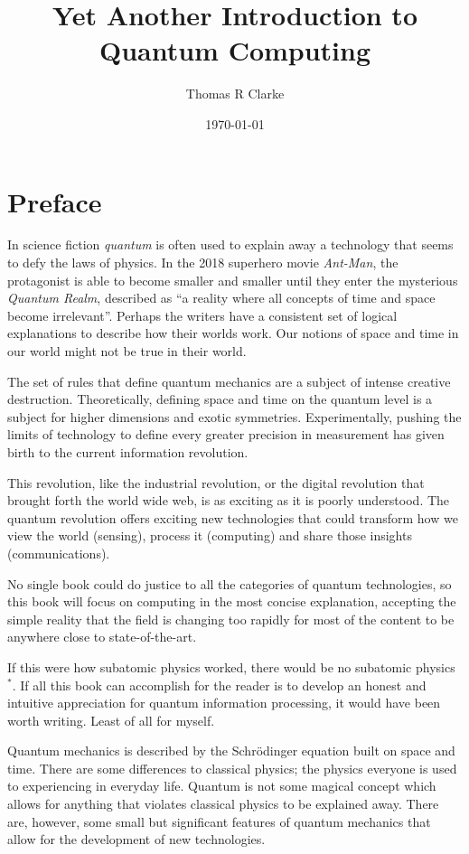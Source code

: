 \documentclass{book}
\title{Yet Another Introduction to Quantum Computing}
\author{Thomas R Clarke}
\date{\today}
\begin{document}
\maketitle

\chapter*{Preface}

In science fiction \textit{quantum} is often used to explain away a technology that seems to defy the laws of physics. In the 2018 superhero movie \textit{Ant-Man}, the protagonist is able to become smaller and smaller until they enter the mysterious \textit{Quantum Realm}, described as “a reality where all concepts of time and space become irrelevant”. Perhaps the writers have a consistent set of logical explanations to describe how their worlds work. Our notions of space and time in our world might not be true in their world. 

The set of rules that define quantum mechanics are a subject of intense creative destruction. Theoretically, defining space and time on the quantum level is a subject for higher dimensions and exotic symmetries. Experimentally, pushing the limits of technology to define every greater precision in measurement has given birth to the current information revolution. 

This revolution, like the industrial revolution, or the digital revolution that brought forth the world wide web, is as exciting as it is poorly understood. The quantum revolution offers exciting new technologies that could transform how we view the world (sensing), process it (computing) and share those insights (communications). 

No single book could do justice to all the categories of quantum technologies, so this book will focus on computing in the most concise explanation, accepting the simple reality that the field is changing too rapidly for most of the content to be anywhere close to state-of-the-art. 

If this were how subatomic physics worked, there would be no subatomic physics $^*$.
If all this book can accomplish for the reader is to develop an honest and intuitive appreciation for quantum information processing, it would have been worth writing. Least of all for myself. 

Quantum mechanics is described by the Schrödinger equation built on space and time. There are some differences to classical physics; the physics everyone is used to experiencing in everyday life. Quantum is not some magical concept which allows for anything that violates classical physics to be explained away. There are, however, some small but significant features of quantum mechanics that allow for the development of new technologies. 
\tableofcontents
\end{document}
